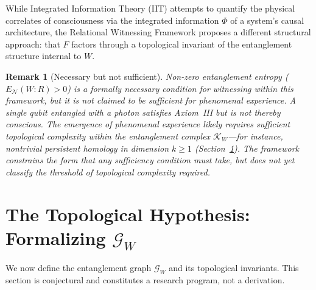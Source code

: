 \documentclass[12pt, a4paper]{article}
\newtheorem{remark}{Remark}
\begin{document}
While Integrated Information Theory (IIT) \cite{Tononi2016} attempts to quantify the physical correlates of consciousness via the integrated information $\Phi$ of a system's causal architecture, the Relational Witnessing Framework proposes a different structural approach: that $F$ factors through a topological invariant of the entanglement structure internal to $W$.

\begin{remark}[Necessary but not sufficient]
Non-zero entanglement entropy ($E_{\mathcal{N}}(W{:}R) > 0$) is a formally \emph{necessary} condition for witnessing within this framework, but it is not claimed to be \emph{sufficient} for phenomenal experience. A single qubit entangled with a photon satisfies Axiom~III but is not thereby conscious. The emergence of phenomenal experience likely requires sufficient topological complexity within the entanglement complex $\mathcal{K}_W$---for instance, nontrivial persistent homology in dimension $k \geq 1$ (Section~\ref{sec:topo}). The framework constrains the form that any sufficiency condition must take, but does not yet classify the threshold of topological complexity required.
\end{remark}

\section{The Topological Hypothesis: Formalizing $\mathcal{G}_W$}
\label{sec:topo}

We now define the entanglement graph $\mathcal{G}_W$ and its topological invariants. This section is conjectural and constitutes a research program, not a derivation.
\end{document}
